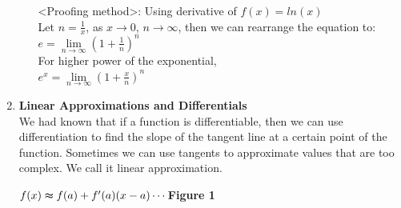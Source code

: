 \documentclass[12px]{article}
\begin{document}
\begin{enumerate}
\begin{enumerate}[(1)]
\begin{center}
            <Proofing method>: Using derivative of $f(x)=ln(x)$\\
            Let $n=\frac{1}{x}$, as $x\to0$, $n\to\infty$, 
            then we can rearrange the equation to:\\
            $e=\lim\limits_{n\to\infty}(1+\frac{1}{n})^{n}$\\
            For higher power of the exponential,\\
            $e^x=\lim\limits_{n\to\infty}(1+\frac{x}{n})^{n}$\\
        \end{center}
    \end{enumerate}
    \item \textbf{Linear Approximations and Differentials}\\
    We had known that if a function is differentiable, then we can use differentiation to find the slope of the tangent line at a certain point of the function. Sometimes we can use tangents to approximate values that are too complex. We call it linear approximation.\\
    \begin{center}
        $f(x)\thickapprox f(a)+f'(a)(x-a) \cdots$\textbf{Figure 1}
    \end{center}
    

\end{enumerate}
\end{document}
